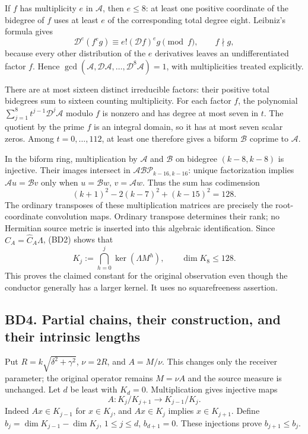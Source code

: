 \documentclass[11pt]{article}
\begin{document}
If \(f\) has multiplicity \(e\) in \(\mathcal A\), then \(e\le8\): at least one positive coordinate of the bidegree of \(f\) uses at least \(e\) of the corresponding total degree eight. Leibniz's formula gives \[
\mathcal D^e(f^eg)\equiv e!(\mathcal Df)^eg\pmod f,\qquad f\nmid g,
\] because every other distribution of the \(e\) derivatives leaves an undifferentiated factor \(f\). Hence \(\gcd(\mathcal A,\mathcal D\mathcal A,\ldots,\mathcal D^8\mathcal A)=1\), with multiplicities treated explicitly.

There are at most sixteen distinct irreducible factors: their positive total bidegrees sum to sixteen counting multiplicity. For each factor \(f\), the polynomial \(\sum_{j=1}^8t^{j-1}\mathcal D^j\mathcal A\) modulo \(f\) is nonzero and has degree at most seven in \(t\). The quotient by the prime \(f\) is an integral domain, so it has at most seven scalar zeros. Among \(t=0,\ldots,112\), at least one therefore gives a biform \(\mathcal B\) coprime to \(\mathcal A\).

In the biform ring, multiplication by \(\mathcal A\) and \(\mathcal B\) on bidegree \((k-8,k-8)\) is injective. Their images intersect in \(\mathcal A\mathcal B\mathcal P_{k-16,k-16}\): unique factorization implies \(\mathcal A u=\mathcal Bv\) only when \(u=\mathcal Bw\), \(v=\mathcal Aw\). Thus the sum has codimension \[
(k+1)^2-2(k-7)^2+(k-15)^2=128. \tag{BD4}
\] The ordinary transposes of these multiplication matrices are precisely the root-coordinate convolution maps. Ordinary transpose determines their rank; no Hermitian source metric is inserted into this algebraic identification. Since \(C_A=\widehat C_A\Lambda\), (BD2) shows that \[
K_j:=\bigcap_{h=0}^j\ker(\Lambda M^h),\qquad \dim K_8\le128. \tag{BD5}
\] This proves the claimed constant for the original observation even though the conductor generally has a larger kernel. It uses no squarefreeness assertion.

\subsection{BD4. Partial chains, their construction, and their intrinsic lengths}\label{bd4.-partial-chains-their-construction-and-their-intrinsic-lengths}

Put \(R=k\sqrt{\delta^2+\gamma^2}\), \(\nu=2R\), and \(A=M/\nu\). This changes only the receiver parameter; the original operator remains \(M=\nu A\) and the source measure is unchanged. Let \(d\) be least with \(K_d=0\). Multiplication gives injective maps \[
A:K_j/K_{j+1}\longrightarrow K_{j-1}/K_j.
\] Indeed \(Ax\in K_{j-1}\) for \(x\in K_j\), and \(Ax\in K_j\) implies \(x\in K_{j+1}\). Define \(b_j=\dim K_{j-1}-\dim K_j\), \(1\le j\le d\), \(b_{d+1}=0\). These injections prove \(b_{j+1}\le b_j\).
\end{document}
